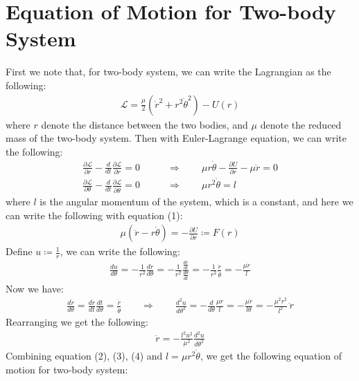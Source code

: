 \documentclass[11pt,oneside]{book}
\theoremstyle{break}
\theoremstyle{break}
\begin{document}
\section[Equation of Motion for Two-body System]{\color{red}Equation of Motion for Two-body System\color{black}}
First we note that, for two-body system, we can write the Lagrangian as the following:
\begin{align*}
\mathcal{L} = \frac{\mu}{2}\left( \dot{r}^2 + r^2 \dot{\theta}^2 \right) - U(r)
\end{align*}
where $r$ denote the distance between the two bodies, and $\mu$ denote the reduced mass of the two-body system. Then with Euler-Lagrange equation, we can write the following:
\begin{align*}
\frac{\partial \mathcal{L}}{\partial r} - \frac{d}{dt}\frac{\partial \mathcal{L}}{\partial \dot{r}} = 0  \qquad &\Rightarrow \qquad \mu r \dot{\theta} - \frac{\partial U}{\partial r} - \mu \ddot{r} = 0 \tag{1}
\\ 
\frac{\partial \mathcal{L}}{\partial \theta} - \frac{d}{dt}\frac{\partial \mathcal{L}}{\partial \dot{\theta}} = 0  \qquad &\Rightarrow \qquad \mu r^2 \dot{\theta} = l \tag{2}
\end{align*}
where $l$ is the angular momentum of the system, which is a constant, and here we can write the following with equation (1):
\begin{align*}
\mu(\ddot{r} - r\dot{\theta}) = -\frac{\partial U}{\partial r} \coloneqq F(r) \tag{3}
\end{align*}
Define $u \coloneqq \frac{1}{r}$, we can write the following:
\begin{align*}
\frac{du}{d\theta} = -\frac{1}{r^2} \frac{dr}{d\theta} = -\frac{1}{r^2}\frac{\frac{dr}{dt}}{\frac{d\theta}{dt}} = -\frac{1}{r^2} \frac{\dot{r}}{\dot{\theta}} = -\frac{\mu \dot{r}}{l}
\end{align*}
Now we have:
\begin{align*}
\frac{d\dot{r}}{d\theta} = \frac{d\dot{r}}{dt}\frac{dt}{d\theta} = \frac{\ddot{r}}{\dot{\theta}}\qquad\Rightarrow\qquad \frac{d^2 u }{d\theta^2} = -\frac{d}{d\theta} \frac{\mu \dot{r}}{l} = -\frac{\mu \ddot{r}}{l\theta} = -\frac{\mu^2r^2}{l^2}\, \ddot{r}
\end{align*}
Rearranging we get the following:
\begin{align*}
\ddot{r} = -\frac{l^2 u^2}{\mu^2}\frac{d^2 u}{d\theta^2} \tag{4}
\end{align*}
Combining equation (2), (3), (4) and $l = \mu r^2 \dot{\theta}$, we get the following equation of motion for two-body system:
\end{document}
